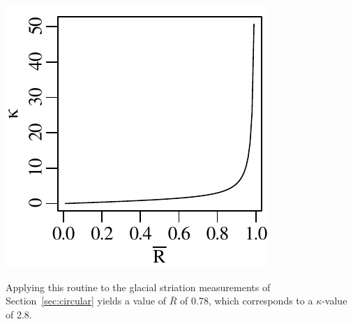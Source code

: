 \noindent\begin{minipage}[t][][b]{.3\textwidth}
\includegraphics[width=\textwidth]{../figures/R2K.pdf}\\
\end{minipage}
\begin{minipage}[t][][t]{.7\textwidth}
  \label{fig:R2K}
\end{minipage}

Applying this routine to the glacial striation measurements of
Section~\ref{sec:circular} yields a value of $\bar{R}$ of 0.78, which
corresponds to a $\kappa$-value of 2.8.

